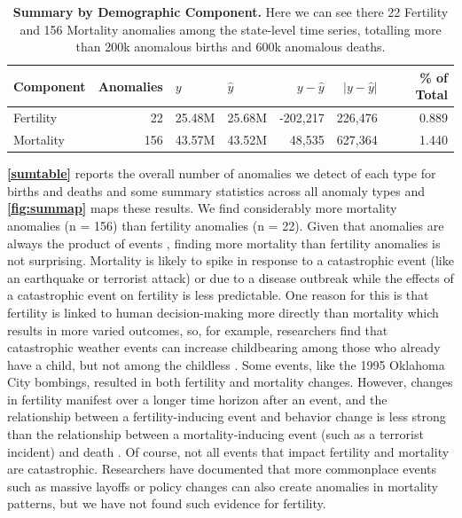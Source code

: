 \documentclass[12pt]{article}
\begin{document}
\begin{table}

\caption{\label{tab:unnamed-chunk-3}\textbf{Summary by Demographic Component.}  Here we can see there 22 Fertility and 156 Mortality anomalies among the state-level time series, totalling more than 200k anomalous births and 600k anomalous deaths. \label{sumtable}}
\centering
\begin{tabular}[t]{lrllrrr}
\toprule
Component & Anomalies & $y$ & $\hat{y}$ & $y-\hat{y}$ & $|y-\hat{y}|$ & \% of Total\\
\midrule
Fertility & 22 & 25.48M & 25.68M & -202,217 & 226,476 & 0.889\\
Mortality & 156 & 43.57M & 43.52M & 48,535 & 627,364 & 1.440\\
\bottomrule
\end{tabular}
\end{table}

\textbf{\autoref{sumtable}} reports the overall number of anomalies we
detect of each type for births and deaths and some summary statistics
across all anomaly types and \textbf{\autoref{fig:summap}} maps these
results. We find considerably more mortality anomalies (n = 156) than
fertility anomalies (n = 22). Given that anomalies are always the
product of events \citep{song2018anomaly}, finding more mortality than
fertility anomalies is not surprising. Mortality is likely to spike in
response to a catastrophic event (like an earthquake or terrorist
attack) or due to a disease outbreak while the effects of a catastrophic
event on fertility is less predictable. One reason for this is that
fertility is linked to human decision-making more directly than
mortality \citep{stein2014couples} which results in more varied
outcomes, so, for example, researchers find that catastrophic weather
events can increase childbearing among those who already have a child,
but not among the childless \citep{Evans2008Hurricanebirth}. Some
events, like the 1995 Oklahoma City bombings, resulted in both fertility
and mortality changes. However, changes in fertility manifest over a
longer time horizon after an event, and the relationship between a
fertility-inducing event and behavior change is less strong than the
relationship between a mortality-inducing event (such as a terrorist
incident) and death \citep{Rodgers2005OKBombing}. Of course, not all
events that impact fertility and mortality are catastrophic. Researchers
have documented that more commonplace events such as massive layoffs
\citep{Venkataramani2019} or policy changes
\citep{Livingston2017Cannabis} can also create anomalies in mortality
patterns, but we have not found such evidence for fertility.
\end{document}
